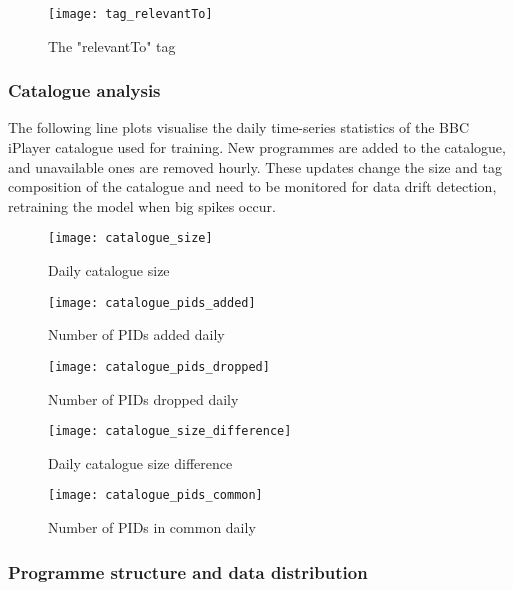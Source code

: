 \begin{figure}[H]
  \centering
  \texttt{[image: tag\_relevantTo]}
  \caption{The "relevantTo" tag}
  \label{fig:tag_relevantTo}
\end{figure}

\subsubsection{Catalogue analysis}

The following line plots visualise the daily time-series statistics of the BBC iPlayer catalogue used for training.
New programmes are added to the catalogue, and unavailable ones are removed hourly.
These updates change the size and tag composition of the catalogue and need to be monitored for data drift detection,
retraining the model when big spikes occur.

\begin{figure}[H]
  \centering
  \texttt{[image: catalogue\_size]}
  \caption{Daily catalogue size}
  \label{fig:catalogue_size}
\end{figure}

\begin{figure}[H]
  \centering
  \texttt{[image: catalogue\_pids\_added]}
  \caption{Number of PIDs added daily}
  \label{fig:catalogue_pids_added}
\end{figure}

\begin{figure}[H]
  \centering
  \texttt{[image: catalogue\_pids\_dropped]}
  \caption{Number of PIDs dropped daily}
  \label{fig:catalogue_pids_dropped}
\end{figure}

\begin{figure}[H]
  \centering
  \texttt{[image: catalogue\_size\_difference]}
  \caption{Daily catalogue size difference}
  \label{fig:catalogue_size_diff}
\end{figure}

\begin{figure}[H]
  \centering
  \texttt{[image: catalogue\_pids\_common]}
  \caption{Number of PIDs in common daily}
  \label{fig:catalogue_size_diff}
\end{figure}

\subsubsection{Programme structure and data distribution}

